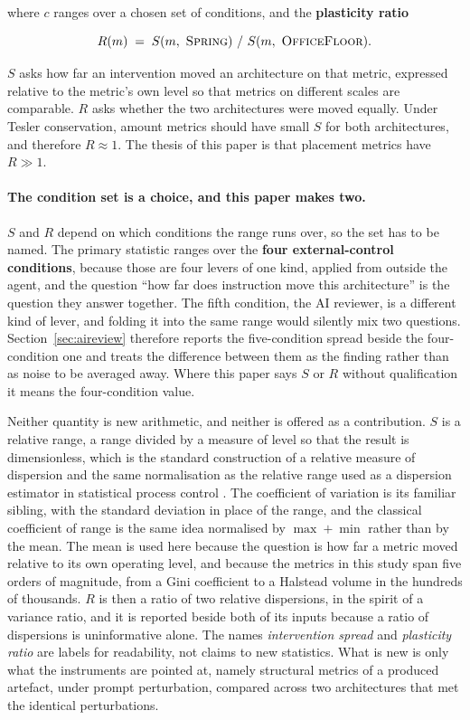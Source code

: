 \documentclass[11pt,a4paper]{article}
\newcommand{\sprg}{\textsc{Spring}}
\newcommand{\offl}{\textsc{OfficeFloor}}
\begin{document}
where $c$ ranges over a chosen set of conditions, and the \textbf{plasticity
ratio}

\begin{equation}
R(m) \;=\; S(m,\ \sprg{})\ /\ S(m,\ \offl{}).
\end{equation}

$S$ asks how far an intervention moved an architecture on that metric,
expressed relative to the metric's own level so that metrics on different
scales are comparable. $R$ asks whether the two architectures were moved
equally. Under Tesler conservation, amount metrics should have small $S$ for
both architectures, and therefore $R \approx 1$. The thesis of this paper is
that placement metrics have $R \gg 1$.

\paragraph{The condition set is a choice, and this paper makes two.} $S$ and $R$
depend on which conditions the range runs over, so the set has to be named. The
primary statistic ranges over the \textbf{four external-control conditions},
because those are four levers of one kind, applied from outside the agent, and
the question ``how far does instruction move this architecture'' is the question
they answer together. The fifth condition, the AI reviewer, is a different kind
of lever, and folding it into the same range would silently mix two questions.
Section~\ref{sec:aireview} therefore reports the five-condition spread beside the
four-condition one and treats the difference between them as the finding rather
than as noise to be averaged away. Where this paper says $S$ or $R$ without
qualification it means the four-condition value.

Neither quantity is new arithmetic, and neither is offered as a contribution.
$S$ is a relative range, a range divided by a measure of level so that the
result is dimensionless, which is the standard construction of a relative
measure of dispersion \cite{yule1950} and the same normalisation as the relative
range used as a dispersion estimator in statistical process control
\cite{montgomery2012}. The coefficient of variation is its familiar sibling,
with the standard deviation in place of the range, and the classical coefficient
of range is the same idea normalised by $\max + \min$ rather than by the mean.
The mean is used here because the question is how far a metric moved relative to
its own operating level, and because the metrics in this study span five orders
of magnitude, from a Gini coefficient to a Halstead volume in the hundreds of
thousands. $R$ is then a ratio of two relative dispersions, in the spirit of a
variance ratio, and it is reported beside both of its inputs because a ratio of
dispersions is uninformative alone. The names \emph{intervention spread} and
\emph{plasticity ratio} are labels for readability, not claims to new statistics.
What is new is only what the instruments are pointed at, namely structural metrics of a
produced artefact, under prompt perturbation, compared across two architectures
that met the identical perturbations.
\end{document}
